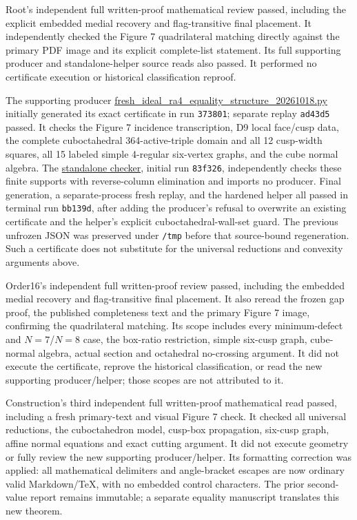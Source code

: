 \documentclass[11pt]{article}
\begin{document}
Root's independent full written-proof mathematical review passed, including the explicit embedded medial recovery and flag-transitive final placement. It independently checked the Figure 7 quadrilateral matching directly against the primary PDF image and its explicit complete-list statement. Its full supporting producer and standalone-helper source reads also passed. It performed no certificate execution or historical classification reproof.

The supporting producer \href{../scripts/fresh_ideal_ra4_equality_structure_20261018.py}{fresh\_ideal\_ra4\_equality\_structure\_20261018.py} initially generated its exact certificate in run \texttt{373801}; separate replay \texttt{ad43d5} passed. It checks the Figure 7 incidence transcription, D9 local face/cusp data, the complete cuboctahedral 364-active-triple domain and all 12 cusp-width squares, all 15 labeled simple 4-regular six-vertex graphs, and the cube normal algebra. The \href{../scripts/check_ideal_ra4_equality_structure_saved_20261018.py}{standalone checker}, initial run \texttt{83f326}, independently checks these finite supports with reverse-column elimination and imports no producer. Final generation, a separate-process fresh replay, and the hardened helper all passed in terminal run \texttt{bb139d}, after adding the producer's refusal to overwrite an existing certificate and the helper's explicit cuboctahedral-wall-set guard. The previous unfrozen JSON was preserved under \texttt{/tmp} before that source-bound regeneration. Such a certificate does not substitute for the universal reductions and convexity arguments above.

Order16's independent full written-proof review passed, including the embedded medial recovery and flag-transitive final placement. It also reread the frozen gap proof, the published completeness text and the primary Figure 7 image, confirming the quadrilateral matching. Its scope includes every minimum-defect and \(N=7\)/\(N=8\) case, the box-ratio restriction, simple six-cusp graph, cube-normal algebra, actual section and octahedral no-crossing argument. It did not execute the certificate, reprove the historical classification, or read the new supporting producer/helper; those scopes are not attributed to it.

Construction's third independent full written-proof mathematical read passed, including a fresh primary-text and visual Figure 7 check. It checked all universal reductions, the cuboctahedron model, cusp-box propagation, six-cusp graph, affine normal equations and exact cutting argument. It did not execute geometry or fully review the new supporting producer/helper. Its formatting correction was applied: all mathematical delimiters and angle-bracket escapes are now ordinary valid Markdown/TeX, with no embedded control characters. The prior second-value report remains immutable; a separate equality manuscript translates this new theorem.
\end{document}
